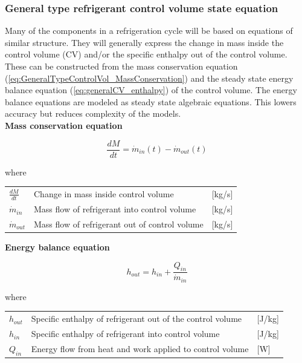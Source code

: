 \subsubsection{General type refrigerant control volume state equation}
Many of the components in a refrigeration cycle will be based on equations of similar structure. They will generally express the change in mass inside the control volume (CV) and/or the specific enthalpy out of the control volume. These can be constructed from the mass conservation equation (\cref{eq:GeneralTypeControlVol_MassConservation}) and the steady state energy balance equation (\cref{eq:generalCV_enthalpy}) of the control volume. The energy balance equations are modeled as steady state algebraic equations. This lowers accuracy but reduces complexity of the models.\\

\noindent \textbf{Mass conservation equation}

\begin{equation} \label{eq:GeneralTypeControlVol_MassConservation}
	\frac{dM}{dt} = \dot{m}_{in}(t) - \dot{m}_{out}(t)
\end{equation}

where

\begin{center}
	\begin{tabular}{l p{8cm} l}
		$\frac{dM}{dt}$ 	& Change in mass inside control volume & [\si{kg}/\si{s}]\\
		$\dot{m}_{in}$ 		& Mass flow of refrigerant into control volume & [\si{kg}/\si{s}]\\
		$\dot{m}_{out}$ 	& Mass flow of refrigerant out of control volume & [\si{kg}/\si{s}]\\
	\end{tabular}
\end{center}

\noindent \textbf{Energy balance equation}

\begin{equation} \label{eq:generalCV_enthalpy}
	h_{out} = h_{in} + \frac{Q_{in}}{\dot{m}_{in}}
\end{equation}

where

\begin{center}
	\begin{tabular}{l p{8cm} l}
		$h_{out}$ 		& Specific enthalpy of refrigerant out of the control volume & [\si{J}/\si{kg}]\\
		$h_{in}$ 		& Specific enthalpy of refrigerant into control volume & [\si{J}/\si{kg}]\\
		$Q_{in}$ 		& Energy flow from heat and work applied to control volume & [\si{W}]\\
	\end{tabular}
\end{center}

